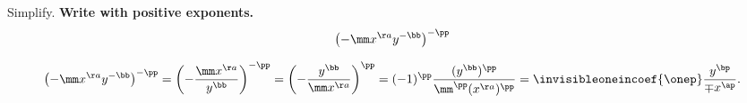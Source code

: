 
















\pgfmathtruncatemacro{\ap}{\aa*\pp}
\pgfmathtruncatemacro{\bp}{\bb*\pp}
\pgfmathtruncatemacro{\mp}{\mm^\pp}






Simplify. \textbf{Write with positive exponents.}
\[
\left(-\mm x^{\aa}y^{-\bb}\right)^{-\pp}
\]


\begin{solution}
\[
\left(-\mm x^{\aa}y^{-\bb}\right)^{-\pp}
=\left(-\dfrac{\mm x^{\aa}}{y^{\bb}}\right)^{-\pp}
=\left(-\dfrac{y^{\bb}}{\mm x^{\aa}}\right)^{\pp}
=(-1)^{\pp}\dfrac{(y^{\bb})^{\pp}}{\mm^{\pp} (x^{\aa})^{\pp}}
=\invisibleoneincoef{\onep}\dfrac{y^{\bp}}{\mp x^{\ap}}.
\]
\end{solution}